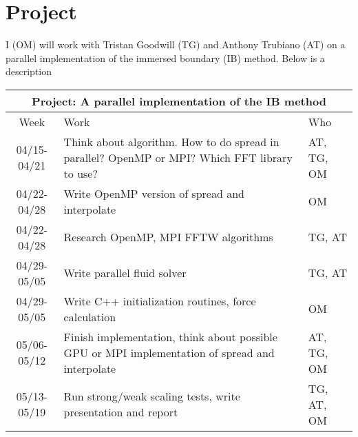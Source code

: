 \documentclass[a4paper]{article}
\begin{document}
\section{Project}
I (OM) will work with Tristan Goodwill (TG) and Anthony Trubiano (AT) on a parallel implementation of the immersed boundary (IB) method. Below is a description

  \begin{center}
  \begin{tabular} {|c|p{9cm}|p{2cm}|}
    \hline
    \multicolumn{3}{|c|}{\bf Project: A parallel implementation of the IB method} \\
    \hline
    Week & Work & Who  \\ \hline \hline
    04/15-04/21 & Think about
    algorithm. How to do spread in parallel? OpenMP or MPI? Which FFT library to use? &  AT, TG, OM \\ \hline
    04/22-04/28 & Write OpenMP version of spread and interpolate & OM \\ \hline
    04/22-04/28 & Research OpenMP, MPI FFTW algorithms & TG, AT \\ \hline
    04/29-05/05 & Write parallel fluid solver & TG, AT \\ \hline
    04/29-05/05 & Write C++ initialization routines, force calculation & OM \\ \hline
    05/06-05/12 & Finish implementation, think about possible GPU or MPI implementation of spread and interpolate & AT, TG, OM \\ \hline
    05/13-05/19 & Run strong/weak scaling tests, write presentation and report  & TG, AT, OM \\ \hline
  \end{tabular}
  \end{center}
\end{document}
